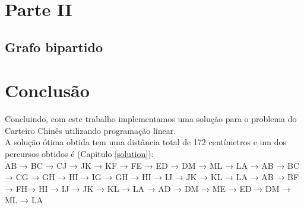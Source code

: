 \documentclass[a4paper]{report}
\begin{document}
\chapter{Parte II}
\section{Grafo bipartido}




\chapter{Conclusão}
Concluindo, com este trabalho implementamos uma solução para o problema do
Carteiro Chinês utilizando programação linear.\\
A solução ótima obtida tem uma distância total de 172 centímetros e um dos
percursos obtidos é (Capitulo \ref{solution}):\\
AB → BC → CJ → JK → KF → FE → ED → DM → ML → LA →
AB → BC → CG → GH → HI  → IG → GH → HI → IJ → JK  → KL  → LA →
AB → BF → FH→ HI  → IJ → JK  → KL  → LA →
AD → DM → ME → ED  → DM → ML → LA\\
\end{document}
